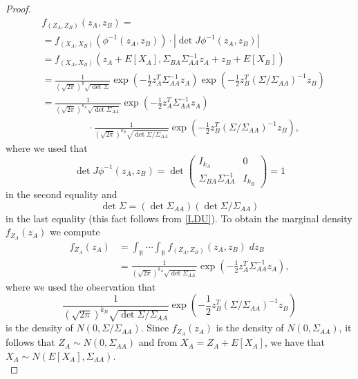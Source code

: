 \documentclass{book}
\theoremstyle{plain}%
\theoremstyle{definition}
\begin{document}
\begin{proof}
\begin{align*}
        &f_{(Z_A,Z_B)}(z_A,z_B)=\\
        &=
        f_{(X_A,X_B)}(\phi^{-1}(z_A,z_B))
        \cdot
        |\det J\phi^{-1}(z_A,z_B)|\\[0.2em]
        &=
        f_{(X_A,X_B)}(z_A+E[X_A], \Sigma_{BA}\Sigma_{AA}^{-1} z_A+z_B+E[X_B])\\
        &=
        \frac{1}{(\sqrt{2\pi})^k \sqrt{\det \Sigma}}
        \exp\left(-\frac{1}{2} z_A^T \Sigma_{AA}^{-1} z_A\right)
        \exp\left(-\frac{1}{2} z_B^T (\Sigma/\Sigma_{AA})^{-1} z_B\right)\\
        &=
        \frac{1}{(\sqrt{2\pi})^{k_{A}} \sqrt{\det \Sigma_{AA}}}
        \exp\left(-\frac{1}{2} z_A^T \Sigma_{AA}^{-1} z_A\right)\\
        &\hspace{2cm}\cdot 
        \frac{1}{(\sqrt{2\pi})^{k_{B}} \sqrt{\det \Sigma/\Sigma_{AA}}}
        \exp\left(-\frac{1}{2} z_B^T (\Sigma/\Sigma_{AA})^{-1} z_B\right),
        \end{align*}
        where we used that 
        $$
        \det J\phi^{-1}(z_A,z_B)=
            \det \begin{pmatrix}
            I_{k_A} & 0\\[0.2em]
            \Sigma_{BA}\Sigma_{AA}^{-1} & I_{k_B}
            \end{pmatrix}=1
        $$
        in the second equality
        and
        $$\det \Sigma=(\det \Sigma_{AA})(\det \Sigma/\Sigma_{AA})$$
        in the last equality (this fact follows from \eqref{LDU}).
        To obtain the marginal density
        $f_{Z_A}(z_A)$ we compute
        \begin{align*}
        f_{Z_A}(z_A)
        &=
        \int_{\mathbb{R}}\cdots \int_{\mathbb{R}}
        f_{(Z_A,Z_B)}(z_A,z_B) \;dz_B\\
        &=
        \frac{1}{(\sqrt{2\pi})^{k_{A}} \sqrt{\det \Sigma_{AA}}}
        \exp\left(-\frac{1}{2} z_A^T \Sigma_{AA}^{-1} z_A\right),
        \end{align*}
        where we used the observation that 
        $$\frac{1}{(\sqrt{2\pi})^{k_{B}} \sqrt{\det \Sigma/\Sigma_{AA}}}
        \exp\left(-\frac{1}{2} z_B^T (\Sigma/\Sigma_{AA})^{-1} z_B\right)$$
        is the density of $N(0,\Sigma/\Sigma_{AA})$.
        Since $f_{Z_A}(z_A)$ is the density of 
        $N(0,\Sigma_{AA})$, it follows that 
        $Z_A\sim N(0,\Sigma_{AA})$
        and from $X_A=Z_A+E[X_A]$, we have that
        $X_A\sim N(E[X_A],\Sigma_{AA})$.\\


\end{proof}
\end{document}
